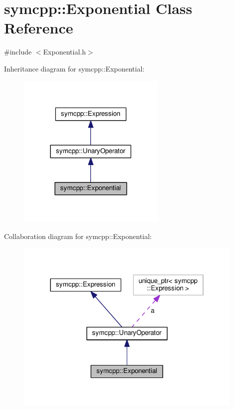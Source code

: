 \hypertarget{classsymcpp_1_1Exponential}{}\section{symcpp\+:\+:Exponential Class Reference}
\label{classsymcpp_1_1Exponential}


{\ttfamily \#include $<$Exponential.\+h$>$}



Inheritance diagram for symcpp\+:\+:Exponential\+:\nopagebreak
\begin{figure}[H]
\begin{center}
\leavevmode
\includegraphics[width=201pt]{classsymcpp_1_1Exponential__inherit__graph}
\end{center}
\end{figure}


Collaboration diagram for symcpp\+:\+:Exponential\+:\nopagebreak
\begin{figure}[H]
\begin{center}
\leavevmode
\includegraphics[width=310pt]{classsymcpp_1_1Exponential__coll__graph}
\end{center}
\end{figure}

